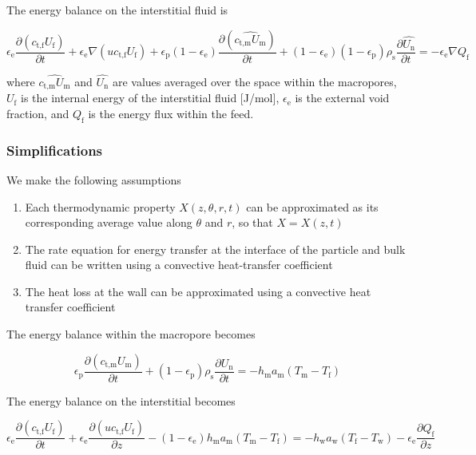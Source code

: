 \documentclass[11pt]{article}
\newcommand{\ee}{\epsilon_{\mathrm{e}}}
\newcommand{\ep}{\epsilon_{\mathrm{p}}}
\newcommand{\rs}{\rho_{\mathrm{s}}}
\newcommand{\textn}{\text{n}}
\newcommand{\textm}{\text{m}}
\newcommand{\textw}{\text{w}}
\newcommand{\textf}{\text{f}}
\newcommand{\ctm}{c_{\text{t,m}}}
\newcommand{\ctf}{c_{\text{t,f}}}
\begin{document}
    The energy balance on the interstitial fluid is

    \begin{equation}
        \ee\frac{\partial (\ctf U_\textf)}{\partial t} + \ee\nabla( u\ctf U_\textf) +
            \ep(1-\ee)\frac{\partial (\widehat{\ctm U_\textm})}{\partial t} + (1-\ee)(1-\ep)\rs\frac{\partial \hat{U_\mathrm{n}}}{\partial t} = - \ee\nabla Q_\textf
    \end{equation}

    where $\widehat{\ctm U_\textm}$ and $\hat{U_\textn}$ are values
    averaged over the space within the macropores,
    $U_\textf$ is the internal energy of the interstitial fluid [J/mol],
    $\ee$ is the external void fraction,
    and $Q_\textf$ is the energy flux within the feed.

    \subsubsection{Simplifications}
    We make the following assumptions

    \begin{enumerate}
        \item Each thermodynamic property $X(z,\theta,r,t)$ can be approximated as its corresponding average value along $\theta$ and $r$,
        so that $X=X(z,t)$
        \item The rate equation for energy transfer at the interface of the particle and bulk fluid can be written using a convective heat-transfer coefficient
        \item The heat loss at the wall can be approximated using a convective heat transfer coefficient
    \end{enumerate}

    The energy balance within the macropore becomes

    \begin{equation}
        \ep\frac{\partial (\ctm U_\textm)}{\partial t} + (1-\ep)\rs\frac{\partial U_\mathrm{n}}{\partial t} = - h_\textm a_{\textm} (T_\textm - T_\textf)
    \end{equation}

    The energy balance on the interstitial becomes

    \begin{equation}
        \ee\frac{\partial (\ctf U_\textf)}{\partial t} + \ee\frac{\partial ( u\ctf U_\textf)}{\partial z} -
        (1-\ee)h_\textm a_{\textm} (T_\textm - T_\textf)
        = - h_\textw a_{\textw} (T_\textf - T_\textw) - \ee\frac{\partial Q_\textf}{\partial z}
    \end{equation}
\end{document}
